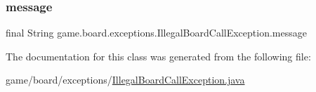 \subsubsection{\texorpdfstring{message}{message}}
{\footnotesize\ttfamily final String game.\+board.\+exceptions.\+Illegal\+Board\+Call\+Exception.\+message\hspace{0.3cm}{\ttfamily [private]}}



The documentation for this class was generated from the following file\+:\begin{DoxyCompactItemize}
\item 
game/board/exceptions/\mbox{\hyperlink{_illegal_board_call_exception_8java}{Illegal\+Board\+Call\+Exception.\+java}}\end{DoxyCompactItemize}
